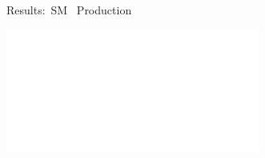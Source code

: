 \documentclass[11pt, xcolor={dvipsnames}, aspectratio=169]{beamer}
\begin{document}
\begin{frame}[standout]
  Results:~SM~\allbold{\HH} Production

  \vspace*{1.5em}

  \includegraphics[scale=1.0]{feynman_graphs/di_higgs_box_inverted}%
  \hspace*{2em}%
\end{frame}



\end{document}
